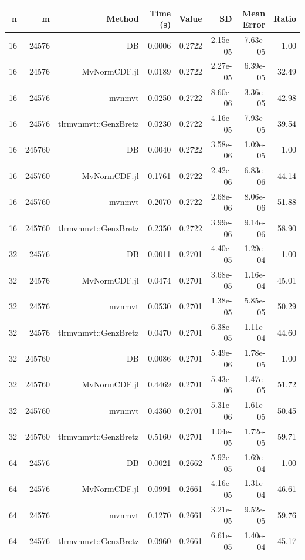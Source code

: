 \begin{tabular}{|r|r|r|r|r|r|r|r|}
  \hline
  \textbf{n} & \textbf{m} & \textbf{Method} & \textbf{Time (s)} & \textbf{Value} & \textbf{SD} & \textbf{Mean Error} & \textbf{Ratio} \\
  \hline
  16 & 24576 & DB & 0.0006 & 0.2722 & 2.15e-05 & 7.63e-05 & 1.00 \\
  16 & 24576 & MvNormCDF.jl & 0.0189 & 0.2722 & 2.27e-05 & 6.39e-05 & 32.49 \\
  16 & 24576 & mvnmvt & 0.0250 & 0.2722 & 8.60e-06 & 3.36e-05 & 42.98 \\
  16 & 24576 & tlrmvnmvt::GenzBretz & 0.0230 & 0.2722 & 4.16e-05 & 7.93e-05 & 39.54 \\
  16 & 245760 & DB & 0.0040 & 0.2722 & 3.58e-06 & 1.09e-05 & 1.00 \\
  16 & 245760 & MvNormCDF.jl & 0.1761 & 0.2722 & 2.42e-06 & 6.83e-06 & 44.14 \\
  16 & 245760 & mvnmvt & 0.2070 & 0.2722 & 2.68e-06 & 8.06e-06 & 51.88 \\
  16 & 245760 & tlrmvnmvt::GenzBretz & 0.2350 & 0.2722 & 3.99e-06 & 9.14e-06 & 58.90 \\
  32 & 24576 & DB & 0.0011 & 0.2701 & 4.40e-05 & 1.29e-04 & 1.00 \\
  32 & 24576 & MvNormCDF.jl & 0.0474 & 0.2701 & 3.68e-05 & 1.16e-04 & 45.01 \\
  32 & 24576 & mvnmvt & 0.0530 & 0.2701 & 1.38e-05 & 5.85e-05 & 50.29 \\
  32 & 24576 & tlrmvnmvt::GenzBretz & 0.0470 & 0.2701 & 6.38e-05 & 1.11e-04 & 44.60 \\
  32 & 245760 & DB & 0.0086 & 0.2701 & 5.49e-06 & 1.78e-05 & 1.00 \\
  32 & 245760 & MvNormCDF.jl & 0.4469 & 0.2701 & 5.43e-06 & 1.47e-05 & 51.72 \\
  32 & 245760 & mvnmvt & 0.4360 & 0.2701 & 5.31e-06 & 1.61e-05 & 50.45 \\
  32 & 245760 & tlrmvnmvt::GenzBretz & 0.5160 & 0.2701 & 1.04e-05 & 1.72e-05 & 59.71 \\
  64 & 24576 & DB & 0.0021 & 0.2662 & 5.92e-05 & 1.69e-04 & 1.00 \\
  64 & 24576 & MvNormCDF.jl & 0.0991 & 0.2661 & 4.16e-05 & 1.31e-04 & 46.61 \\
  64 & 24576 & mvnmvt & 0.1270 & 0.2661 & 3.21e-05 & 9.52e-05 & 59.76 \\
  64 & 24576 & tlrmvnmvt::GenzBretz & 0.0960 & 0.2661 & 6.61e-05 & 1.40e-04 & 45.17 \\

\end{tabular}
